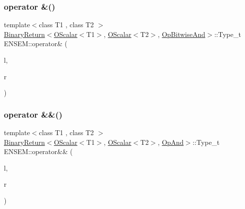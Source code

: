 \subsubsection{\texorpdfstring{operator \&()}{operator \&()}}
{\footnotesize\ttfamily template$<$class T1 , class T2 $>$ \\
\mbox{\hyperlink{structENSEM_1_1BinaryReturn}{Binary\+Return}}$<$\mbox{\hyperlink{classENSEM_1_1OScalar}{O\+Scalar}}$<$T1$>$, \mbox{\hyperlink{classENSEM_1_1OScalar}{O\+Scalar}}$<$T2$>$, \mbox{\hyperlink{structENSEM_1_1OpBitwiseAnd}{Op\+Bitwise\+And}}$>$\+::Type\+\_\+t E\+N\+S\+E\+M\+::operator\& (\begin{DoxyParamCaption}\item[{const \mbox{\hyperlink{classENSEM_1_1OScalar}{O\+Scalar}}$<$ T1 $>$ \&}]{l,  }\item[{const \mbox{\hyperlink{classENSEM_1_1OScalar}{O\+Scalar}}$<$ T2 $>$ \&}]{r }\end{DoxyParamCaption})\hspace{0.3cm}{\ttfamily [inline]}}

\mbox{\label{group__obsscalar_ga7e3b0e4d68793d07ed6616df54117609}} 
\subsubsection{\texorpdfstring{operator \&\&()}{operator \&\&()}}
{\footnotesize\ttfamily template$<$class T1 , class T2 $>$ \\
\mbox{\hyperlink{structENSEM_1_1BinaryReturn}{Binary\+Return}}$<$\mbox{\hyperlink{classENSEM_1_1OScalar}{O\+Scalar}}$<$T1$>$, \mbox{\hyperlink{classENSEM_1_1OScalar}{O\+Scalar}}$<$T2$>$, \mbox{\hyperlink{structENSEM_1_1OpAnd}{Op\+And}}$>$\+::Type\+\_\+t E\+N\+S\+E\+M\+::operator\&\& (\begin{DoxyParamCaption}\item[{const \mbox{\hyperlink{classENSEM_1_1OScalar}{O\+Scalar}}$<$ T1 $>$ \&}]{l,  }\item[{const \mbox{\hyperlink{classENSEM_1_1OScalar}{O\+Scalar}}$<$ T2 $>$ \&}]{r }\end{DoxyParamCaption})\hspace{0.3cm}{\ttfamily [inline]}}

\mbox{\label{group__obsscalar_gaa78e8f77d7f0b9803c015de6cc93c228}} 

